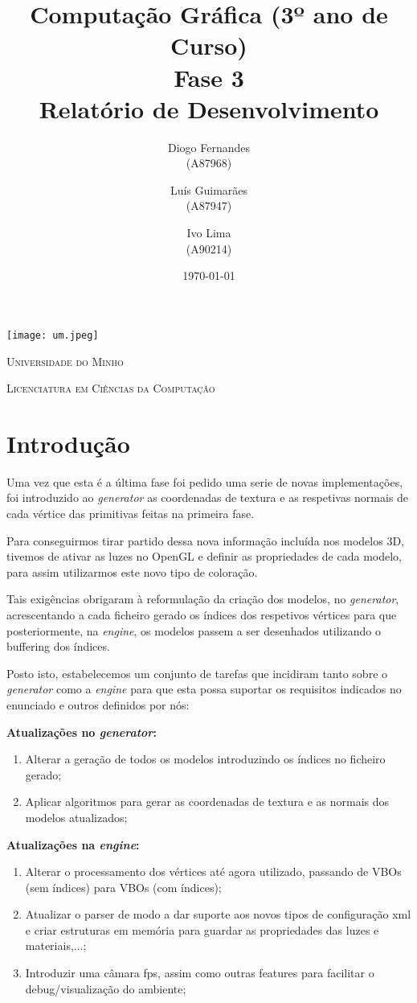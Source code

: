 \documentclass[11pt,a4paper]{report}
\title{Computação Gráfica (3º ano de Curso)\\
       \textbf{Fase 3}\\ Relatório de Desenvolvimento
       } %
\author{Diogo Fernandes\\ (A87968) \and Luís Guimarães\\ (A87947)
         \and Ivo Lima\\ (A90214)
       } %
\date{\today} %
\begin{document}
	\begin{minipage}{0.9\linewidth}
        \centering
		\texttt{[image: um.jpeg]}\par\vspace{1cm}
		{\scshape\LARGE Universidade do Minho} \par
		\vspace{0.6cm}
		{\scshape\Large Licenciatura em Ciências da Computação} \par
		\maketitle
	\end{minipage}


\tableofcontents %

\chapter{Introdução}
Uma vez que esta é a última fase foi pedido uma serie de novas implementações, foi introduzido ao \emph{generator} as coordenadas de textura e as respetivas normais de cada vértice das primitivas feitas  na primeira fase. 

Para conseguirmos tirar partido dessa nova informação incluída nos modelos 3D, tivemos de ativar as luzes no OpenGL e definir as propriedades de cada modelo, para assim utilizarmos este novo tipo de coloração.

Tais exigências obrigaram à reformulação da criação dos modelos, no \emph{generator}, acrescentando a cada ficheiro gerado os índices dos respetivos vértices para que posteriormente, na \emph{engine}, os modelos passem a ser desenhados utilizando o buffering dos índices.

Posto isto, estabelecemos um conjunto de tarefas que incidiram tanto sobre o \emph{generator} como a \emph{engine} para que esta possa suportar os requisitos indicados no enunciado e outros definidos por nós:

{\bfseries Atualizações no \emph{generator}:}
\begin{enumerate} 
\item Alterar a geração de todos os modelos introduzindo os índices no ficheiro gerado;
\item Aplicar algoritmos para gerar as coordenadas de textura e as normais dos modelos atualizados;
\end{enumerate}

{\bfseries Atualizações na \emph{engine}:}
\begin{enumerate} 
\item Alterar o processamento dos vértices até agora utilizado, passando de VBOs (sem índices) para VBOs (com índices);
\item Atualizar o parser de modo a dar suporte aos novos tipos de configuração xml e criar estruturas em memória para guardar as propriedades das luzes e materiais,...;
\item Introduzir uma câmara fps, assim como outras features para facilitar o debug/visualização do ambiente;
\end{enumerate}
\end{document}
